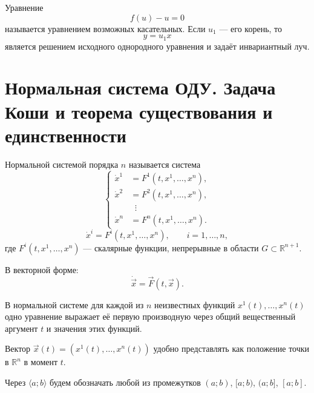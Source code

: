 \documentclass[12pt,a4paper]{article}
\numberwithin{equation}{section}
\newcommand{\R}{\mathbb{R}}
\newcommand{\vect}[1]{\vec{#1}}
\DeclareRobustCommand{\examtag}[1]{\space{\normalfont\small\color{HSEgray}(#1)}}
\begin{document}
\begin{definitionHSE}
Уравнение
\[
f(u)-u=0
\]
называется уравнением возможных касательных. Если $u_1$ --- его корень, то
\[
y=u_1x
\]
является решением исходного однородного уравнения и задаёт инвариантный луч.
\end{definitionHSE}

\section[Нормальная система ОДУ\examtag{вопрос~12}]{Нормальная система ОДУ. Задача Коши и теорема существования и единственности\examtag{вопрос~12}}

\begin{definitionHSE}
Нормальной системой порядка $n$ называется система
\[
\left\{
\begin{aligned}
\dot{x}^1 &= F^1(t, x^1, \dots, x^n),\\[3pt]
\dot{x}^2 &= F^2(t, x^1, \dots, x^n),\\[3pt]
&\;\;\vdots\\
\dot{x}^n &= F^n(t, x^1, \dots, x^n).
\end{aligned}
\right.
\]
\begin{equation}
\dot{x}^i=F^i(t,x^1,\ldots,x^n),\qquad i=1,\ldots,n,
\label{eq:normal-system}
\end{equation}
где \(F^i(t,x^1,\ldots,x^n)\) --- скалярные функции, непрерывные в области \(G\subset\R^{n+1}\).

В векторной форме:
\[
\dot{\vect{x}}=\vect{F}(t,\vect{x}).
\]
\end{definitionHSE}

В нормальной системе для каждой из \(n\) неизвестных функций
\(x^1(t),\ldots,x^n(t)\) одно уравнение выражает её первую производную
через общий вещественный аргумент \(t\) и значения этих функций.

Вектор \(\vect{x}(t) = (x^1(t),\ldots,x^n(t))\) удобно представлять как положение точки в \(\mathbb{R}^n\) в момент \(t\).

\begin{remarkHSE}
Через $\langle a; b\rangle$ будем обозначать любой из промежутков
$(a; b)$, $[a; b)$, $(a; b]$, $[a; b]$.
\end{remarkHSE}
\end{document}
